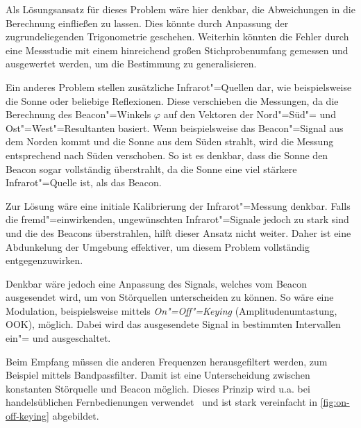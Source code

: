 {Als Lösungsansatz für dieses Problem wäre hier denkbar, die Abweichungen in die Berechnung einfließen zu lassen. Dies könnte durch Anpassung der zugrundeliegenden Trigonometrie geschehen. Weiterhin könnten die Fehler durch eine Messstudie mit einem hinreichend großen Stichprobenumfang gemessen und ausgewertet werden, um die Bestimmung zu generalisieren.


Ein anderes Problem stellen zusätzliche Infrarot"=Quellen dar, wie beispielsweise die Sonne oder beliebige Reflexionen. Diese verschieben die Messungen, da die Berechnung des Beacon"=Winkels $\varphi$ auf den Vektoren der Nord"=Süd"= und Ost"=West"=Resultanten basiert. Wenn beispielsweise das Beacon"=Signal aus dem Norden kommt und die Sonne aus dem Süden strahlt, wird die Messung entsprechend nach Süden verschoben. So ist es denkbar, dass die Sonne den Beacon sogar vollständig überstrahlt, da die Sonne eine viel stärkere Infrarot"=Quelle ist, als das Beacon.

Zur Lösung wäre eine initiale Kalibrierung der Infrarot"=Messung denkbar. Falls die fremd"=einwirkenden, ungewünschten Infrarot"=Signale jedoch zu stark sind und die des Beacons überstrahlen, hilft dieser Ansatz nicht weiter. Daher ist eine Abdunkelung der Umgebung effektiver, um diesem Problem vollständig entgegenzuwirken.

Denkbar wäre jedoch eine Anpassung des Signals, welches vom Beacon ausgesendet wird, um von Störquellen unterscheiden zu können. So wäre eine Modulation, beispielsweise mittels \emph{On"=Off"=Keying} (Amplitudenumtastung, OOK), möglich. Dabei wird das ausgesendete Signal in bestimmten Intervallen ein"= und ausgeschaltet. 

Beim Empfang müssen die anderen Frequenzen herausgefiltert werden, zum Beispiel mittels Bandpassfilter. Damit ist eine Unterscheidung zwischen konstanten Störquelle und Beacon möglich. Dieses Prinzip wird u.a. bei handelsüblichen Fernbedienungen verwendet~\cite{ewaldIRFernbedienungen2019} und ist stark vereinfacht in \autoref{fig:on-off-keying} abgebildet.

}
